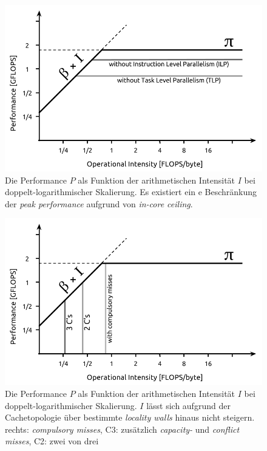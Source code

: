 		\begin{figure}[t]
		\centering
	    	\includegraphics[height=0.35\textheight]{chapter1/pictures/roofline_model_2.png}
    		\caption[Roofline Modell - \textit{in-core ceiling}]{Die Performance $P$ als Funktion der arithmetischen Intensität $I$ bei doppelt-logarithmischer Skalierung. Es existiert ein e Beschränkung der \textit{peak performance} aufgrund von \textit{in-core ceiling}. \autocite{wikiRLM}}
    		\label{1:rl2}
		\end{figure}

		\begin{figure}[b]
		\centering
    		\includegraphics[height=0.35\textheight]{chapter1/pictures/roofline_model_3.png}
	    	\caption[Roofline Modell - \textit{locality walls}]{Die Performance $P$ als Funktion der arithmetischen Intensität $I$ bei doppelt-logarithmischer Skalierung. $I$ lässt sich aufgrund der Cachetopologie über bestimmte \textit{locality walls} hinaus nicht steigern. rechts: \textit{compulsory misses}, C3: zusätzlich \textit{capacity-} und \textit{conflict misses}, C2: zwei von drei \autocite{wikiRLM}}
    		\label{1:rl3}
		\end{figure}
		
